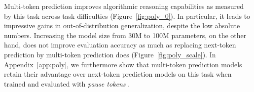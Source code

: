 Multi-token prediction improves algorithmic reasoning capabilities as measured by this task across task difficulties (Figure~\ref{fig:poly_0}). In particular, it leads to impressive gains in out-of-distribution generalization, despite the low absolute numbers. Increasing the model size from 30M to 100M parameters, on the other hand, does not improve evaluation accuracy as much as replacing next-token prediction by multi-token prediction does (Figure~\ref{fig:poly_scale}). In Appendix~\ref{app:poly}, we furthermore show that multi-token prediction models retain their advantage over next-token prediction models on this task when trained and evaluated with \emph{pause tokens} \citep{goyal2023think}.

